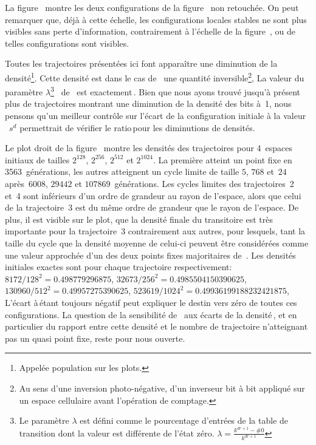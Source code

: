 \noindent%
La figure~ montre les deux configurations de
la figure~ non retouchée. %
On peut remarquer que, déjà à cette échelle, les configurations
locales stables ne sont plus visibles sans perte d'information,
contrairement à l'échelle de la figure~, ou de
telles configurations sont visibles. %

Toutes les trajectoires présentées ici font apparaître une diminution de
la densité\footnote{%
  Appelée population sur les plots.}. %
Cette densité est dans le cas de~ une quantité
inversible\footnote{%
  Au sens d'une inversion photo-négative, d'un inverseur bit à bit appliqué
  sur un espace cellulaire avant l'opération de comptage.}, %
La valeur du paramètre $\lambda$\footnote{%
  Le paramètre $\lambda$ est défini comme le pourcentage d'entrées de
  la table de transition dont la valeur est différente de l'état zéro. %
  $\lambda = \frac{k^{dr+1}-\#0}{k^{dr+1}}$}~\cite{Li90a,Li90b}
de~ est exactement\,\undemi. %
Bien que nous ayons trouvé jusqu'à présent plus de trajectoires
montrant une diminution de la densité des bits à~1, nous pensons qu'un
meilleur contrôle sur l'écart de la configuration initiale à la
valeur\,\undemi~$s^d$ permettrait de vérifier le ratio\,\undemi pour
les diminutions de densités. %

Le plot droit de la figure~ montre les
densités des trajectoires pour 4~espaces initiaux de tailles
$2^{128}$, $2^{256}$, $2^{512}$ et $2^{1024}$. %
La première atteint un point fixe en 3563~générations, les autres
atteignent un cycle limite de taille $5$, $768$ et~$24$ après~$6008$,
$29442$ et $107869$~générations. %
Les cycles limites des trajectoires~2 et~4 sont inférieurs d'un ordre
de grandeur au rayon de l'espace, alors que celui de la trajectoire~3
est du même ordre de grandeur que le rayon de l'espace. %
De plus, il est visible sur le plot, que la densité finale du
transitoire est très importante pour la trajectoire~3 contrairement
aux autres, pour lesquels, tant la taille du cycle que la densité
moyenne de celui-ci peuvent être considérées comme une valeur approchée
d'un des deux points fixes majoritaires de~. %
Les densités initiales exactes sont pour chaque trajectoire
respectivement:~%
$8172/128^2 = 0.498779296875$, %
$32673/256^2 = 0.4985504150390625$, %
$130960/512^2 = 0.49957275390625$, %
$523619/1024^2 = 0.49936199188232421875$, %
L'écart à\,\undemi étant toujours négatif peut expliquer le destin
vers zéro de toutes ces configurations. %
La question de la sensibilité de~ aux écarts de la
densité\,\undemi, et en particulier du rapport entre cette densité et
le nombre de trajectoire n'atteignant pas un quasi point fixe, reste
pour nous ouverte. %

